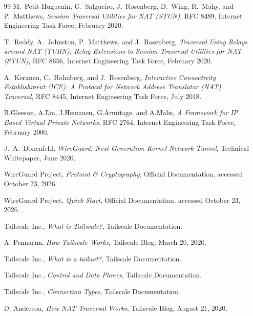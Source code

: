 \begin{thebibliography}{99}
	M.~Petit-Huguenin, G.~Salgueiro, J.~Rosenberg, D.~Wing, R.~Mahy, and P.~Matthews,
	\textit{Session Traversal Utilities for NAT (STUN)},
	RFC 8489,
	Internet Engineering Task Force,
	February 2020.

	T.~Reddy, A.~Johnston, P.~Matthews, and J.~Rosenberg,
	\textit{Traversal Using Relays around NAT (TURN): Relay Extensions to Session Traversal Utilities for NAT (STUN)},
	RFC 8656,
	Internet Engineering Task Force,
	February 2020.

	A.~Keranen, C.~Holmberg, and J.~Rosenberg,
	\textit{Interactive Connectivity Establishment (ICE): A Protocol for Network Address Translator (NAT) Traversal},
	RFC 8445,
	Internet Engineering Task Force,
	July 2018.

	B.\~Gleeson, A.\~Lin, J.\~Heinanen, G.\~Armitage, and A.\~Malis,
	\textit{A Framework for IP Based Virtual Private Networks},
	RFC 2764,
	Internet Engineering Task Force,
	February 2000.

	J.~A.~Donenfeld,
	\textit{WireGuard: Next Generation Kernel Network Tunnel},
	Technical Whitepaper,
	June 2020.

	WireGuard Project,
	\textit{Protocol \& Cryptography},
	Official Documentation,
	accessed October 23, 2026.

	WireGuard Project,
	\textit{Quick Start},
	Official Documentation,
	accessed October 23, 2026.

	Tailscale Inc.,
	\emph{What is Tailscale?},
	Tailscale Documentation.

	A. Pennarun,
	\emph{How Tailscale Works},
	Tailscale Blog, March 20, 2020.

	Tailscale Inc.,
	\emph{What is a tailnet?},
	Tailscale Documentation.

	Tailscale Inc.,
	\emph{Control and Data Planes},
	Tailscale Documentation.

	Tailscale Inc.,
	\emph{Connection Types},
	Tailscale Documentation.

	D. Anderson,
	\emph{How NAT Traversal Works},
	Tailscale Blog, August 21, 2020.
\end{thebibliography}
